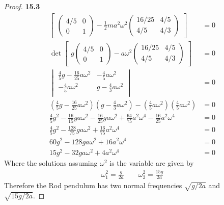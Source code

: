 \documentclass[11pt]{article}
\theoremstyle{definition}
\begin{document}
\begin{proof}{\textbf{15.3}}
\begin{align*}
\begin{bmatrix}
\begin{pmatrix}
                4/5 & 0\\
                0 & 1
            \end{pmatrix}
            - \frac{1}{2}ma^2\omega^2 \begin{pmatrix}
                16/25 & 4/5\\
                4/5 & 4/3
            \end{pmatrix}
        \end{bmatrix} &= 0\\
        \det\begin{bmatrix}
            g \begin{pmatrix}
                4/5 & 0\\
                0 & 1
            \end{pmatrix}
            - a\omega^2 \begin{pmatrix}
                16/25 & 4/5\\
                4/5 & 4/3
            \end{pmatrix}
        \end{bmatrix} &= 0\\
        \begin{vmatrix}
            \frac{4}{5}g -\frac{16}{25}a\omega^2 & -\frac{4}{5}a\omega^2\\
            -\frac{4}{5}a\omega^2 & g -\frac{4}{3}a\omega^2\\
        \end{vmatrix}
        &= 0\\
        \left(\frac{4}{5}g -\frac{16}{25}a\omega^2 \right)
        \left(g -\frac{4}{3}a\omega^2 \right)
        - \left(\frac{4}{5}a\omega^2\right)
        \left(\frac{4}{5}a\omega^2\right) &= 0\\
        \frac{4}{5}g^2 - \frac{16}{15}ga\omega^2
        - \frac{16}{25}ga\omega^2 + \frac{64}{75}a^2\omega^4
        - \frac{16}{25}a^2\omega^4 &= 0\\
        \frac{4}{5}g^2 - \frac{128}{75}ga\omega^2
        + \frac{16}{75}a^2\omega^4 &= 0\\
        60g^2 - 128ga\omega^2 + 16a^2\omega^4 &= 0\\
        15g^2 - 32ga\omega^2 + 4a^2\omega^4 &= 0
    \end{align*}
    Where the solutions assuming $\omega^2$ is the variable are given by
    \begin{align*}
        \omega_1^2 = \frac{g}{2a} \qquad \omega_2^2 = \frac{15g}{2a}
    \end{align*}
    Therefore the Rod pendulum has two normal frequencies $\sqrt{g/2a}$ and\\
    $\sqrt{15g/2a}$.


\end{proof}
\end{document}
